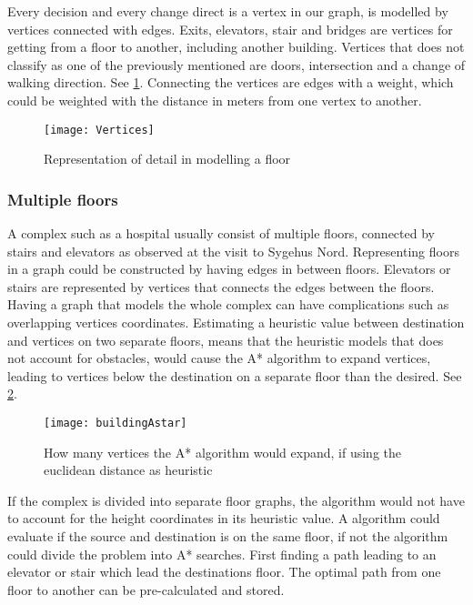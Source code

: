 Every decision and every change direct is a vertex in our graph, is modelled by vertices connected with edges. Exits, elevators, stair and bridges are vertices for getting from a floor to another, including another building. Vertices that does not classify as one of the previously mentioned are doors, intersection and a change of walking direction. See \cref{fig:Vertices}. Connecting the vertices are edges with a weight, which could be weighted with the distance in meters from one vertex to another.

\begin{figure}[ht!]
    \centering
    \texttt{[image: Vertices]}
    \caption{Representation of detail in modelling a floor}
    \label{fig:Vertices}
  \end{figure}
\subsubsection{Multiple floors}

A complex such as a hospital usually consist of multiple floors, connected by stairs and elevators as observed at the visit to Sygehus Nord. Representing floors in a graph could be constructed by having edges in between floors. Elevators or stairs are represented by vertices that connects the edges between the floors. Having a graph that models the whole complex can have complications such as overlapping vertices coordinates. Estimating a heuristic value between destination and vertices on two separate floors, means that the heuristic models that does not account for obstacles, would cause the A* algorithm to expand vertices, leading to vertices below the destination on a separate floor than the desired. See \cref{fig:buildingAstar}.

\begin{figure}[ht!]
    \centering
    \texttt{[image: buildingAstar]}
    \caption{How many vertices the A* algorithm would expand, if using the euclidean distance as heuristic}
    \label{fig:buildingAstar}
  \end{figure}

If the complex is divided into separate floor graphs, the algorithm would not have to account for the height coordinates in its heuristic value. A algorithm could evaluate if the source and destination is on the same floor, if not the algorithm could divide the problem into A* searches. First finding a path leading to an elevator or stair which lead the destinations floor. The optimal path from one floor to another can be pre-calculated and stored. 


